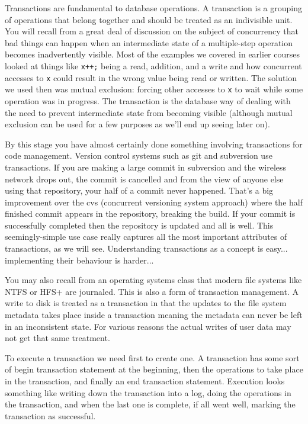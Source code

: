 \documentclass[a4paper]{report}
\begin{document}
Transactions are fundamental to database operations. A transaction is a grouping of operations that belong together and should be treated as an indivisible unit. You will recall from a great deal of discussion on the subject of concurrency that bad things can happen when an intermediate state of a multiple-step operation becomes inadvertently visible. Most of the examples we covered in earlier courses looked at things like \texttt{x++;} being a read, addition, and a write and how concurrent accesses to \texttt{x} could result in the wrong value being read or written. The solution we used then was mutual exclusion: forcing other accesses to \texttt{x} to wait while some operation was in progress. The transaction is the database way of dealing with the need to prevent intermediate state from becoming visible (although mutual exclusion can be used for a few purposes as we'll end up seeing later on).

By this stage you have almost certainly done something involving transactions for code management. Version control systems such as git and subversion use transactions. If you are making a large commit in subversion and the wireless network drops out, the commit is cancelled and from the view of anyone else using that repository, your half of a commit never happened. That's a big improvement over the cvs (concurrent versioning system approach) where the half finished commit appears in the repository, breaking the build. If your commit is successfully completed then the repository is updated and all is well. This seemingly-simple use case really captures all the most important attributes of transactions, as we will see. Understanding transactions as a concept is easy... implementing their behaviour is harder...

You may also recall from an operating systems class that modern file systems like NTFS or HFS+ are journaled. This is also a form of transaction management. A write to disk is treated as a transaction in that the updates to the file system metadata takes place inside a transaction meaning the metadata can never be left in an inconsistent state. For various reasons the actual writes of user data may not get that same treatment.

To execute a transaction we need first to create one. A transaction has some sort of begin transaction statement at the beginning, then the operations to take place in the transaction, and finally an end transaction statement. Execution looks something like writing down the transaction into a log, doing the operations in the transaction, and when the last one is complete, if all went well, marking the transaction as successful. 
\end{document}
